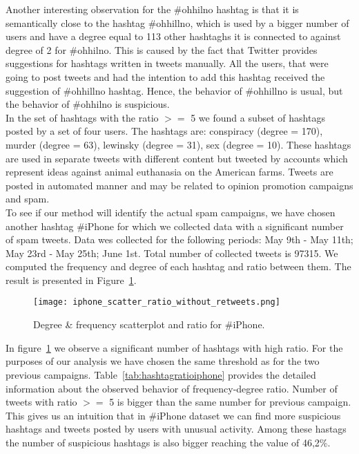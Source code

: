 \documentclass[journal, a4paper, 12pt]{article}
\begin{document}
Another interesting observation for the \#ohhilno hashtag is that it is semantically close to the hashtag \#ohhillno, which is used by a bigger number of users and have a degree equal to 113 other hashtaghs it is connected to against degree of 2 for \#ohhilno. This is caused by the fact that Twitter provides suggestions for hashtags written in tweets manually. All the users, that were going to post tweets and had the intention to add this hashtag received the suggestion of \#ohhillno hashtag. Hence, the behavior of \#ohhillno is usual, but the behavior of \#ohhilno is suspicious. \\

In the set of hashtags with the ratio $>=$ 5 we found a subset of hashtags posted by a set of four users. The hashtags are: conspiracy (degree = 170), murder (degree = 63), lewinsky (degree = 31), sex (degree = 10). These hashtags are used in separate tweets with different content but tweeted by accounts which represent ideas against animal euthanasia on the American farms. Tweets are posted in automated manner and may be related to opinion promotion campaigns and spam. \\


To see if our method will identify the actual spam campaigns, we have chosen another hashtag \#iPhone for which we collected data with a significant number of spam tweets. Data wes collected for the following periods: May 9th - May 11th; May 23rd - May 25th; June 1st. Total number of collected tweets is 97315. We computed the frequency and degree of each hashtag and ratio between them. The result is presented in Figure~\ref{fig:scatter_ratio_iphone}.
\\
        \begin{figure}[!hbt]
            \begin{center}
            \texttt{[image: iphone\_scatter\_ratio\_without\_retweets.png]}
            \caption{Degree \& frequency scatterplot and ratio for \#iPhone.}
            \label{fig:scatter_ratio_iphone}
            \end{center}
      \end{figure}
    
In figure~\ref{fig:scatter_ratio_iphone} we observe a significant number of hashtags with high ratio. For the purposes of our analysis we have chosen the same threshold as for the two previous campaigns. Table~\ref{tab:hashtagratioiphone} provides the detailed information about the observed behavior of frequency-degree ratio. Number of tweets with ratio $>=$ 5 is bigger than the same number for previous campaign. This gives us an intuition that in \#iPhone dataset we can find more suspicious hashtags and tweets posted by users with unusual activity. Among these hastags the number of suspicious hashtags is also bigger reaching the value of 46,2\%.
\\
    
\end{document}
